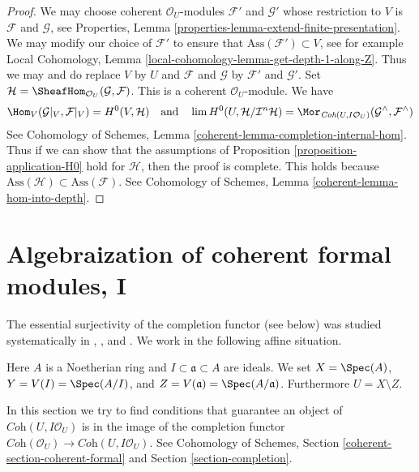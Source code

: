 \begin{proof}
We may choose coherent $\mathcal{O}_U$-modules
$\mathcal{F}'$ and $\mathcal{G}'$ whose restriction to $V$
is $\mathcal{F}$ and $\mathcal{G}$, see
Properties, Lemma \ref{properties-lemma-extend-finite-presentation}.
We may modify our choice of $\mathcal{F}'$ to ensure that
$\text{Ass}(\mathcal{F}') \subset V$, see for example
Local Cohomology, Lemma \ref{local-cohomology-lemma-get-depth-1-along-Z}.
Thus we may and do replace $V$ by $U$ and $\mathcal{F}$ and $\mathcal{G}$
by $\mathcal{F}'$ and $\mathcal{G}'$.
Set $\mathcal{H} = \SheafHom_{\mathcal{O}_U}(\mathcal{G}, \mathcal{F})$.
This is a coherent $\mathcal{O}_U$-module. We have
$$
\Hom_V(\mathcal{G}|_V, \mathcal{F}|_V) =
H^0(V, \mathcal{H})
\quad\text{and}\quad
\lim H^0(U, \mathcal{H}/\mathcal{I}^n\mathcal{H}) =
\Mor_{\textit{Coh}(U, I\mathcal{O}_U)}
(\mathcal{G}^\wedge, \mathcal{F}^\wedge)
$$
See Cohomology of Schemes, Lemma \ref{coherent-lemma-completion-internal-hom}.
Thus if we can show that the assumptions of
Proposition \ref{proposition-application-H0}
hold for $\mathcal{H}$, then the proof is complete.
This holds because
$\text{Ass}(\mathcal{H}) \subset \text{Ass}(\mathcal{F})$.
See Cohomology of Schemes, Lemma
\ref{coherent-lemma-hom-into-depth}.
\end{proof}








\section{Algebraization of coherent formal modules, I}
\label{section-algebraization-modules}

\noindent
The essential surjectivity of the completion functor (see below)
was studied systematically in
\cite{SGA2}, \cite{MRaynaud-book}, and \cite{MRaynaud-paper}.
We work in the following affine situation.

\begin{situation}
\label{situation-algebraize}
Here $A$ is a Noetherian ring and $I \subset \mathfrak a \subset A$ are ideals.
We set $X = \Spec(A)$, $Y = V(I) = \Spec(A/I)$, and
$Z = V(\mathfrak a) = \Spec(A/\mathfrak a)$. Furthermore $U = X \setminus Z$.
\end{situation}

\noindent
In this section we try to find conditions that guarantee an object
of $\textit{Coh}(U, I\mathcal{O}_U)$ is in the image of the completion functor
$\textit{Coh}(\mathcal{O}_U) \to \textit{Coh}(U, I\mathcal{O}_U)$.
See Cohomology of Schemes, Section \ref{coherent-section-coherent-formal} and
Section \ref{section-completion}.

